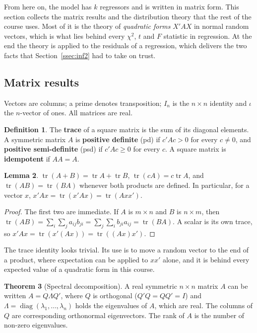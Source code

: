 \documentclass[11pt,a4paper]{article}
\numberwithin{equation}{section}
\DeclareMathOperator{\tr}{tr}
\theoremstyle{definition}
\newtheorem{thm}{Theorem}[subsection]
\newtheorem{defn}[thm]{Definition}
\newtheorem{lem}[thm]{Lemma}
\begin{document}
From here on, the model has $k$ regressors and is written in matrix form. This section collects the matrix results and the distribution
theory that the rest of the course uses. Most of it is the theory of \emph{quadratic forms} $X'AX$ in normal random vectors, which is what lies
behind every $\chi^2$, $t$ and $F$ statistic in regression. At the end the theory is applied to the residuals of a regression, which delivers
the two facts that Section~\ref{ssec:inf2} had to take on trust.

\subsection{Matrix results}
\label{ssec:matrix}

Vectors are columns; a prime denotes transposition; $I_n$ is the $n \times n$ identity and $\iota$ the $n$-vector of ones. All matrices are real.

\begin{defn}
The \textbf{trace} of a square matrix is the sum of its diagonal elements. A symmetric matrix $A$ is \textbf{positive definite} (pd) if $c'Ac > 0$ for
every $c \neq 0$, and \textbf{positive semi-definite} (psd) if $c'Ac \geq 0$ for every $c$. A square matrix is \textbf{idempotent} if $AA = A$.
\end{defn}

\begin{lem}
\label{lem:trace}
$\tr(A + B) = \tr A + \tr B$, $\tr(cA) = c\tr A$, and $\tr(AB) = \tr(BA)$ whenever both products are defined. In particular, for a vector $x$,
$x'Ax = \tr(x'Ax) = \tr(Axx')$.
\end{lem}

\begin{proof}
The first two are immediate. If $A$ is $m \times n$ and $B$ is $n \times m$, then $\tr(AB) = \sum_i\sum_j a_{ij}b_{ji} = \sum_j\sum_i b_{ji}a_{ij} = \tr(BA)$.
A scalar is its own trace, so $x'Ax = \tr(x'(Ax)) = \tr((Ax)x')$.
\end{proof}

The trace identity looks trivial. Its use is to move a random vector to the end of a product, where expectation can be applied to $xx'$ alone,
and it is behind every expected value of a quadratic form in this course.

\begin{thm}[Spectral decomposition]
\label{thm:spectral}
A real symmetric $n \times n$ matrix $A$ can be written $A = Q\Lambda Q'$, where $Q$ is orthogonal ($Q'Q = QQ' = I$) and
$\Lambda = \operatorname{diag}(\lambda_1, \dots, \lambda_n)$ holds the eigenvalues of $A$, which are real. The columns of $Q$ are corresponding
orthonormal eigenvectors. The rank of $A$ is the number of non-zero eigenvalues.
\end{thm}
\end{document}

